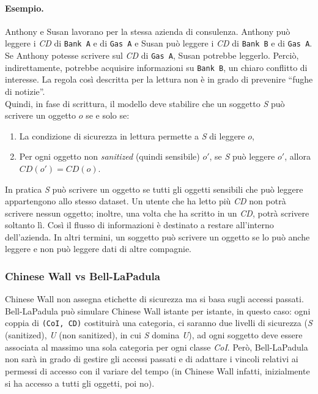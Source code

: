 \paragraph{Esempio.}
Anthony e Susan lavorano per la stessa azienda di consulenza.
Anthony può leggere i \textit{CD} di \verb|Bank A| e di \verb|Gas A| e Susan
può leggere i \textit{CD} di \verb|Bank B| e di \verb|Gas A|. Se Anthony potesse
scrivere sul \textit{CD} di \verb|Gas A|, Susan potrebbe leggerlo. Perciò,
indirettamente, potrebbe acquisire informazioni su
\verb|Bank B|, un chiaro conflitto di interesse. La regola così descritta per la
lettura non è in grado di prevenire “fughe di notizie”.\\

Quindi, in fase di scrittura, il modello deve stabilire che un soggetto \textit{S}
può scrivere un oggetto \(o\) se e solo se:

\begin{enumerate}
    \item La condizione di sicurezza in lettura permette a \textit{S} di
          leggere \(o\),
    \item Per ogni oggetto non \textit{sanitized} (quindi sensibile) \(o'\),
          se \textit{S} può leggere \(o'\), allora \(CD(o') = CD(o)\).
\end{enumerate}

In pratica \textit{S} può scrivere un oggetto se tutti gli oggetti sensibili
che può leggere appartengono allo stesso dataset. Un utente che ha letto più
\textit{CD} non potrà scrivere nessun oggetto; inoltre, una volta
che ha scritto in un \textit{CD}, potrà scrivere soltanto lì.
Così il flusso di informazioni è destinato a restare all'interno dell'azienda.
In altri termini, un
soggetto può scrivere un oggetto se lo può anche leggere e non può leggere dati
di altre compagnie.

\subsubsection{Chinese Wall vs Bell-LaPadula}

Chinese Wall non assegna etichette di sicurezza
ma si basa sugli accessi passati. Bell-LaPadula può
simulare Chinese Wall istante per istante, in questo
caso: ogni coppia di \verb|(CoI, CD)| costituirà una
categoria, ci saranno due livelli di sicurezza (\textit{S}
(sanitized), \textit{U} (non sanitized), in cui \textit{S} domina \textit{U}),
ad ogni soggetto deve essere associata al massimo
una sola categoria per ogni classe \textit{CoI}. Però,
Bell-LaPadula non sarà in grado di gestire gli
accessi passati e di adattare i vincoli relativi ai
permessi di accesso con il variare del tempo (in
Chinese Wall infatti, inizialmente si ha accesso a
tutti gli oggetti, poi no).

